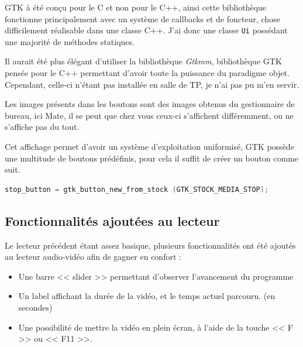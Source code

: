 \documentclass[a4paper, 11pt]{article}
\begin{document}
	\begin{remarque}
		GTK à été conçu pour le C et non pour le C++, ainsi cette bibliothèque fonctionne principalement avec un système de callbacks et de foncteur, chose
		difficilement réalisable dans une classe C++. J'ai donc une classe \texttt{Ui} possédant une majorité de méthodes statiques. 

		Il aurait été plus élégant d'utiliser la bibliothèque \textit{Gtkmm}, bibliothèque GTK pensée pour le C++ permettant d'avoir toute la puissance du
		paradigme objet. Cependant, celle-ci n'étant pas installée en salle de TP, je n'ai pas pu m'en servir.
	\end{remarque}

	\begin{remarque}
		Les images présents dans les boutons sont des images obtenus du gestionnaire de bureau, ici Mate, il se peut que chez vous ceux-ci s'affichent
		différemment, ou ne s'affiche pas du tout. 

		Cet affichage permet d'avoir un système d'exploitation uniformisé, GTK possède une multitude de boutons prédéfinis, pour cela il suffit de créer un
		bouton comme suit.
		\begin{lstlisting}[language=C, numbers=none,linewidth=400px ]
stop_button = gtk_button_new_from_stock (GTK_STOCK_MEDIA_STOP);
		\end{lstlisting}
	\end{remarque}

	\subsection{Fonctionnalités ajoutées au lecteur}
	Le lecteur précédent étant assez basique, plusieurs fonctionnalités ont été ajoutés au lecteur audio-vidéo afin de gagner en confort : 
	\begin{itemize}
		\item Une barre << slider >> permettant d'observer l'avancement du programme
		\item Un label affichant la durée de la vidéo, et le
			temps actuel parcouru. (en secondes)
		\item Une possibilité de mettre la vidéo en plein
			écran, à l'aide de la touche << F >> ou << F11 >>.
	\end{itemize}
	\subsection{}
	\appendix
	\lstlistoflistings
	\listoffigures
	
\end{document}
